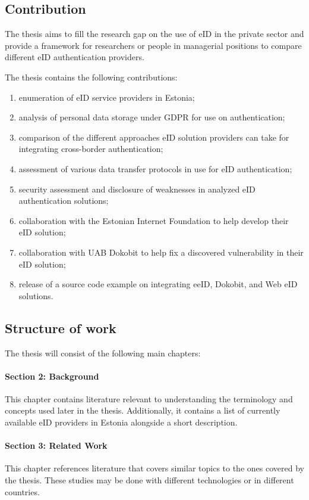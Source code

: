 \subsection{Contribution}

The thesis aims to fill the research gap on the use of eID in the private sector and provide a framework for researchers or people in managerial positions to compare different eID authentication providers.

The thesis contains the following contributions:

\begin{enumerate}
    \item enumeration of eID service providers in Estonia;
    \item analysis of personal data storage under GDPR for use on authentication;
    \item comparison of the different approaches eID solution providers can take for integrating cross-border authentication;
    \item assessment of various data transfer protocols in use for eID authentication;
    \item security assessment and disclosure of weaknesses in analyzed eID authentication solutions;
    \item collaboration with the Estonian Internet Foundation to help develop their eID solution;
    \item collaboration with UAB Dokobit to help fix a discovered vulnerability in their eID solution;
    \item release of a source code example on integrating eeID, Dokobit, and Web eID solutions.
\end{enumerate}

\subsection{Structure of work}


The thesis will consist of the following main chapters:

\paragraph{Section 2: Background} This chapter contains literature relevant to understanding the terminology and concepts used later in the thesis. Additionally, it contains a list of currently available eID providers in Estonia alongside a short description.
\paragraph{Section 3: Related Work} This chapter references literature that covers similar topics to the ones covered by the thesis. These studies may be done with different technologies or in different countries.
